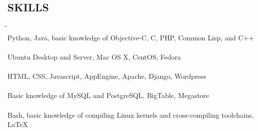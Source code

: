 \documentclass{res}
\begin{document}
\begin{resume}
\section{SKILLS}
  \vspace{-5pt}
  \begin{tabbing}
  \hspace{2.5in}\= \hspace{3.45in}\= \kill %
  \hspace{-0.25in}{\bf Programming Languages} \> \> \\
    Python, Java, basic knowledge of Objective-C, C, PHP, Common Lisp, and C++\\
  \hspace{-0.25in}{\bf Operating Systems} \> \> \\
    Ubuntu Desktop and Server, Mac OS X, CentOS, Fedora\\
  \hspace{-0.25in}{\bf Web Development} \> \> \\
    HTML, CSS, Javascript, AppEngine, Apache, Django, Wordpress\\
  \hspace{-0.25in}{\bf Databases} \> \> \\
    Basic knowledge of MySQL and PostgreSQL, BigTable, Megastore\\
  \hspace{-0.25in}{\bf Systems Administration} \> \> \\
    Bash, basic knowledge of compiling Linux kernels and cross-compiling toolchains, \LaTeX\\
  \vspace{-0.4in}


\end{tabbing}
\end{resume}
\end{document}

